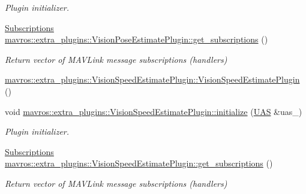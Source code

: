 \begin{DoxyCompactItemize}
\begin{DoxyCompactList}\small\item\em Plugin initializer. \end{DoxyCompactList}\item 
\mbox{\hyperlink{group__plugin_ga8967d61fc77040e0c3ea5a4585d62a09}{Subscriptions}} \mbox{\hyperlink{group__plugin_ga89567b4d29bc8a805270e131c89fab3d}{mavros\+::extra\+\_\+plugins\+::\+Vision\+Pose\+Estimate\+Plugin\+::get\+\_\+subscriptions}} ()
\begin{DoxyCompactList}\small\item\em Return vector of M\+A\+V\+Link message subscriptions (handlers) \end{DoxyCompactList}\item 
\mbox{\hyperlink{group__plugin_ga07495c5fc78a5b2e75f92d062c2ed7b1}{mavros\+::extra\+\_\+plugins\+::\+Vision\+Speed\+Estimate\+Plugin\+::\+Vision\+Speed\+Estimate\+Plugin}} ()
\item 
void \mbox{\hyperlink{group__plugin_ga81a7aa98620a46b76f89020201d47198}{mavros\+::extra\+\_\+plugins\+::\+Vision\+Speed\+Estimate\+Plugin\+::initialize}} (\mbox{\hyperlink{classmavros_1_1UAS}{U\+AS}} \&uas\+\_\+)
\begin{DoxyCompactList}\small\item\em Plugin initializer. \end{DoxyCompactList}\item 
\mbox{\hyperlink{group__plugin_ga8967d61fc77040e0c3ea5a4585d62a09}{Subscriptions}} \mbox{\hyperlink{group__plugin_gaf84b1b053a36a50e34346d397033dada}{mavros\+::extra\+\_\+plugins\+::\+Vision\+Speed\+Estimate\+Plugin\+::get\+\_\+subscriptions}} ()
\begin{DoxyCompactList}\small\item\em Return vector of M\+A\+V\+Link message subscriptions (handlers) \end{DoxyCompactList}\end{DoxyCompactItemize}
